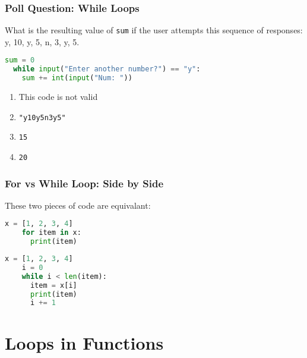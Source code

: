 \documentclass{beamer}
\begin{document}
%
%
\begin{frame}[fragile]
  \frametitle{Poll Question: While Loops}
  What is the resulting value of \lstinline|sum| if the user attempts this sequence of responses: y, 10, y, 5, n, 3, y, 5.
  \begin{lstlisting}[language=Python, autogobble]
  sum = 0
  while input("Enter another number?") == "y":
    sum += int(input("Num: "))
  \end{lstlisting}
  \vfill
  \begin{enumerate}[A]
    \item This code is not valid 
    \item \lstinline|"y10y5n3y5"|
    \item \lstinline|15|
    \item \lstinline|20|
  \end{enumerate}
\end{frame}

%
%
\begin{frame}[fragile]
  \frametitle{For vs While Loop: Side by Side}
  These two pieces of code are equivalant:
  \begin{minipage}{0.48\textwidth}
    \begin{lstlisting}[language=Python, autogobble]
    x = [1, 2, 3, 4]
    for item in x:
      print(item)
    \end{lstlisting}
  \end{minipage}
  \hfill
  \begin{minipage}{0.48\textwidth}
    \begin{lstlisting}[language=Python, autogobble]
    x = [1, 2, 3, 4]
    i = 0
    while i < len(item):
      item = x[i]
      print(item)
      i += 1
    \end{lstlisting}
  \end{minipage}
\end{frame}



\section{Loops in Functions}
\end{document}
